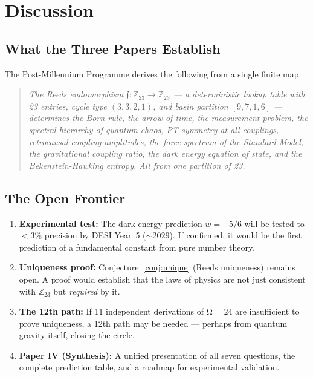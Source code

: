 \documentclass[12pt,a4paper]{article}
\theoremstyle{definition}\newtheorem{definition}[theorem]{Definition}
\theoremstyle{remark}\newtheorem{remark}[theorem]{Remark}
\renewcommand{\O}{\mathrm{\Omega}}
\newcommand{\Reeds}{\mathfrak{f}}\newcommand{\Zp}{\mathbb{Z}_{23}}
\begin{document}
\section{Discussion}
\label{sec:discussion}

\subsection{What the Three Papers Establish}

The Post-Millennium Programme derives the following from a single finite map:

\begin{quote}
\emph{The Reeds endomorphism $\Reeds: \Zp \to \Zp$ --- a deterministic lookup
table with 23 entries, cycle type $(3,3,2,1)$, and basin partition
$[9,7,1,6]$ --- determines the Born rule, the arrow of time, the measurement
problem, the spectral hierarchy of quantum chaos, PT symmetry at all couplings,
retrocausal coupling amplitudes, the force spectrum of the Standard Model, the
gravitational coupling ratio, the dark energy equation of state, and the
Bekenstein-Hawking entropy. All from one partition of 23.}
\end{quote}

\subsection{The Open Frontier}

\begin{enumerate}
  \item \textbf{Experimental test:} The dark energy prediction $w = -5/6$ will
  be tested to $< 3\%$ precision by DESI Year~5 ($\sim 2029$). If confirmed,
  it would be the first prediction of a fundamental constant from pure number
  theory.

  \item \textbf{Uniqueness proof:} Conjecture~\ref{conj:unique} (Reeds
  uniqueness) remains open. A proof would establish that the laws of physics
  are not just consistent with $\Zp$ but \emph{required} by it.

  \item \textbf{The 12th path:} If 11 independent derivations of $\O = 24$ are
  insufficient to prove uniqueness, a 12th path may be needed --- perhaps from
  quantum gravity itself, closing the circle.

  \item \textbf{Paper IV (Synthesis):} A unified presentation of all seven
  questions, the complete prediction table, and a roadmap for experimental
  validation.
\end{enumerate}
\end{document}
